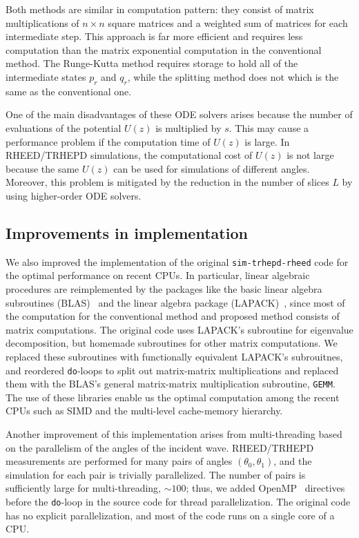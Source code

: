 \documentclass[preprint, 5p, times, sort&compress]{elsarticle}
\begin{document}
        Both methods are similar in computation pattern: they consist of
        matrix multiplications of $n\times n$ square matrices and a weighted sum of matrices for each intermediate step.
        This approach is far more efficient and requires less computation than
        the matrix exponential computation in the conventional method.
        The Runge-Kutta method requires storage to hold all of the intermediate states $p_r$ and $q_r$,
        while the splitting method does not which is the same as the conventional one.

        One of the main disadvantages of these ODE solvers arises because
        the number of evaluations of the potential $U(z)$ is multiplied by $s$.
        This may cause a performance problem if the computation time of $U(z)$ is large.
        In RHEED\slash TRHEPD simulations, the computational cost of $U(z)$ is not large
        because the same $U(z)$ can be used for simulations of different angles.
        Moreover, this problem is mitigated by the reduction in the number of slices $L$ by using higher-order ODE solvers.

        \subsection{Improvements in implementation}\label{ss:hpc}
        We also improved the implementation of the original \texttt{sim-trhepd-rheed} code for the optimal performance on recent CPUs. In particular, 
        linear algebraic procedures are reimplemented by the packages like
        the basic linear algebra subroutines (BLAS)~\cite{Lawson1979} and the linear algebra package (LAPACK)~\cite{lapack1999}, since
        most of the computation for the conventional method and proposed method consists of matrix computations.
        The original code uses LAPACK's subroutine for eigenvalue decomposition,
        but homemade subroutines for other matrix computations.
        We replaced these subroutines with functionally equivalent LAPACK's subrouitnes,
        and reordered \texttt{do}-loops to split out matrix-matrix multiplications and 
        replaced them with the BLAS's general matrix-matrix multiplication subroutine, \texttt{GEMM}.
        The use of these libraries enable us the optimal computation among the recent CPUs such as SIMD and the multi-level cache-memory hierarchy.
        
        

        Another improvement of this implementation arises from multi-threading based on the parallelism of
        the angles of the incident wave.
        RHEED\slash TRHEPD measurements are performed for many pairs of angles $(\theta_0, \theta_1)$,
        and the simulation for each pair is trivially parallelized.
        The number of pairs is sufficiently large for multi-threading, $\sim 100$;
        thus, we added OpenMP~\cite{OpenMP2018} directives before the \texttt{do}-loop in the source code for thread parallelization.
        The original code has no explicit parallelization, and most of the code runs on a single core of a CPU.
\end{document}
